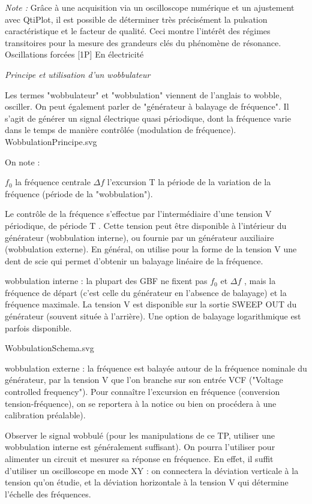 \documentclass{article}%
\begin{document}
\textit{Note :}
Grâce à une acquisition via un oscilloscope numérique et un ajustement avec QtiPlot, il est possible de déterminer très précisément la pulsation caractéristique et le facteur de qualité. Ceci montre l'intérêt des régimes transitoires pour la mesure des grandeurs clés du phénomène de résonance.
Oscillations forcées
[1P] En électricité

\textit{Principe et utilisation d'un wobbulateur}

Les termes "wobbulateur" et "wobbulation" viennent de l'anglais to wobble, osciller. On peut également parler de "générateur à balayage de fréquence". Il s'agit de générer un signal électrique quasi périodique, dont la fréquence varie dans le temps de manière contrôlée (modulation de fréquence).
WobbulationPrincipe.svg

On note :

    $f_0$ la fréquence centrale
    $\Delta f$ l'excursion
    T la période de la variation de la fréquence (période de la "wobbulation").

Le contrôle de la fréquence s'effectue par l'intermédiaire d'une tension V périodique, de période T . Cette tension peut être disponible à l'intérieur du générateur (wobbulation interne), ou fournie par un générateur auxiliaire (wobbulation externe). En général, on utilise pour la forme de la tension V une dent de scie qui permet d'obtenir un balayage linéaire de la fréquence.

    wobbulation interne : la plupart des GBF ne fixent pas $f_{0}$ et $\Delta f$ , mais la fréquence de départ (c'est celle du générateur en l'absence de balayage) et la fréquence maximale. La tension V est disponible sur la sortie SWEEP OUT du générateur (souvent située à l'arrière). Une option de balayage logarithmique est parfois disponible.

WobbulationSchema.svg

    wobbulation externe : la fréquence est balayée autour de la fréquence nominale du générateur, par la tension V que l'on branche sur son entrée VCF ("Voltage controlled frequency"). Pour connaître l'excursion en fréquence (conversion tension-fréquence), on se reportera à la notice ou bien on procédera à une calibration préalable).

Observer le signal wobbulé (pour les manipulations de ce TP, utiliser une wobbulation interne est généralement suffisant). On pourra l'utiliser pour alimenter un circuit et mesurer sa réponse en fréquence. En effet, il suffit d'utiliser un oscilloscope en mode XY  : on connectera la déviation verticale à la tension qu'on étudie, et la déviation horizontale à la tension V qui détermine l'échelle des fréquences.
\end{document}
